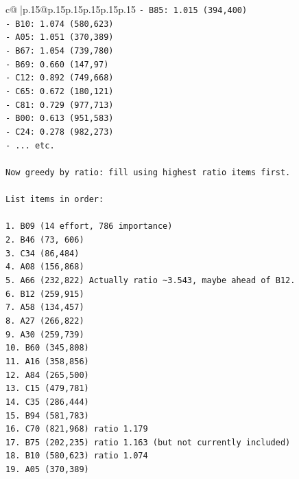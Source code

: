 \documentclass{article}
\begin{document}
{\begin{supertabular}{c@{$\;$}|p{.15\linewidth}@{}p{.15\linewidth}p{.15\linewidth}p{.15\linewidth}p{.15\linewidth}p{.15\linewidth}}
{{{\texttt{{-} B85: 1.015 (394,400)} \\
\texttt{{-} B10: 1.074 (580,623)} \\
\texttt{{-} A05: 1.051 (370,389)} \\
\texttt{{-} B67: 1.054 (739,780)} \\
\texttt{{-} B69: 0.660 (147,97)} \\
\texttt{{-} C12: 0.892 (749,668)} \\
\texttt{{-} C65: 0.672 (180,121)} \\
\texttt{{-} C81: 0.729 (977,713)} \\
\texttt{{-} B00: 0.613 (951,583)} \\
\texttt{{-} C24: 0.278 (982,273)} \\
\texttt{{-} ... etc.} \\
\\ 
\texttt{Now greedy by ratio: fill using highest ratio items first.} \\
\\ 
\texttt{List items in order:} \\
\\ 
\texttt{1. B09 (14 effort, 786 importance)} \\
\texttt{2. B46 (73, 606)} \\
\texttt{3. C34 (86,484)} \\
\texttt{4. A08 (156,868)} \\
\texttt{5. A66 (232,822) Actually ratio \textasciitilde{}3.543, maybe ahead of B12.} \\
\texttt{6. B12 (259,915)} \\
\texttt{7. A58 (134,457)} \\
\texttt{8. A27 (266,822)} \\
\texttt{9. A30 (259,739)} \\
\texttt{10. B60 (345,808)} \\
\texttt{11. A16 (358,856)} \\
\texttt{12. A84 (265,500)} \\
\texttt{13. C15 (479,781)} \\
\texttt{14. C35 (286,444)} \\
\texttt{15. B94 (581,783)} \\
\texttt{16. C70 (821,968) ratio 1.179} \\
\texttt{17. B75 (202,235) ratio 1.163 (but not currently included)} \\
\texttt{18. B10 (580,623) ratio 1.074} \\
\texttt{19. A05 (370,389)} \\
}}}
\end{supertabular}}
\end{document}

